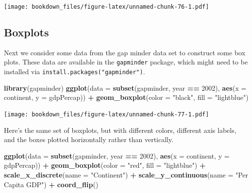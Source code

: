 \documentclass[
]{krantz}
\makeatletter
\newenvironment{Shaded}{\begin{snugshade}}{\end{snugshade}}
\newcommand{\DataTypeTok}[1]{\textcolor[rgb]{0.27,0.27,0.27}{#1}}
\newcommand{\DecValTok}[1]{\textcolor[rgb]{0.06,0.06,0.06}{#1}}
\newcommand{\KeywordTok}[1]{\textcolor[rgb]{0.27,0.27,0.27}{\textbf{#1}}}
\newcommand{\NormalTok}[1]{#1}
\newcommand{\OperatorTok}[1]{\textcolor[rgb]{0.43,0.43,0.43}{\textbf{#1}}}
\newcommand{\StringTok}[1]{\textcolor[rgb]{0.5,0.5,0.5}{#1}}
\newenvironment{kframe}{%
\medskip{}
\setlength{\fboxsep}{.8em}
 \def\at@end@of@kframe{}%
 \ifinner\ifhmode%
  \def\at@end@of@kframe{\end{minipage}}%
  \begin{minipage}{\columnwidth}%
 \fi\fi%
 \def\FrameCommand##1{\hskip\@totalleftmargin \hskip-\fboxsep
 \colorbox{shadecolor}{##1}\hskip-\fboxsep
     \hskip-\linewidth \hskip-\@totalleftmargin \hskip\columnwidth}%
 \MakeFramed {\advance\hsize-\width
   \@totalleftmargin\z@ \linewidth\hsize
   \@setminipage}}%
 {\par\unskip\endMakeFramed%
 \at@end@of@kframe}
\renewenvironment{Shaded}{\begin{kframe}}{\end{kframe}}
\makeatother
\begin{document}
\texttt{[image: bookdown\_files/figure-latex/unnamed-chunk-76-1.pdf]}

\hypertarget{boxplots}{%
\subsection{Boxplots}\label{boxplots}}

Next we consider some data from the gap minder data set to construct some box plots. These data are available in the \texttt{gapminder} package, which might need to be installed via \texttt{install.packages("gapminder")}.

\begin{Shaded}
\begin{Highlighting}[]
\KeywordTok{library}\NormalTok{(gapminder)}
\KeywordTok{ggplot}\NormalTok{(}\DataTypeTok{data =} \KeywordTok{subset}\NormalTok{(gapminder,  year }\OperatorTok{==}\StringTok{ }\DecValTok{2002}\NormalTok{), }
       \KeywordTok{aes}\NormalTok{(}\DataTypeTok{x =}\NormalTok{ continent, }\DataTypeTok{y =}\NormalTok{ gdpPercap)) }\OperatorTok{+}\StringTok{ }
\StringTok{    }\KeywordTok{geom\_boxplot}\NormalTok{(}\DataTypeTok{color =} \StringTok{"black"}\NormalTok{, }\DataTypeTok{fill =} \StringTok{"lightblue"}\NormalTok{)}
\end{Highlighting}
\end{Shaded}

\texttt{[image: bookdown\_files/figure-latex/unnamed-chunk-77-1.pdf]}

Here's the same set of boxplots, but with different colors, different axis labels, and the boxes plotted horizontally rather than vertically.

\begin{Shaded}
\begin{Highlighting}[]
\KeywordTok{ggplot}\NormalTok{(}\DataTypeTok{data =} \KeywordTok{subset}\NormalTok{(gapminder,  year }\OperatorTok{==}\StringTok{ }\DecValTok{2002}\NormalTok{), }
       \KeywordTok{aes}\NormalTok{(}\DataTypeTok{x =}\NormalTok{ continent, }\DataTypeTok{y =}\NormalTok{ gdpPercap)) }\OperatorTok{+}\StringTok{ }
\StringTok{    }\KeywordTok{geom\_boxplot}\NormalTok{(}\DataTypeTok{color =} \StringTok{"red"}\NormalTok{, }\DataTypeTok{fill =} \StringTok{"lightblue"}\NormalTok{) }\OperatorTok{+}\StringTok{ }
\StringTok{    }\KeywordTok{scale\_x\_discrete}\NormalTok{(}\DataTypeTok{name =} \StringTok{"Continent"}\NormalTok{) }\OperatorTok{+}\StringTok{ }
\StringTok{    }\KeywordTok{scale\_y\_continuous}\NormalTok{(}\DataTypeTok{name =} \StringTok{"Per Capita GDP"}\NormalTok{) }\OperatorTok{+}\StringTok{ }\KeywordTok{coord\_flip}\NormalTok{()}
\end{Highlighting}
\end{Shaded}
\end{document}
